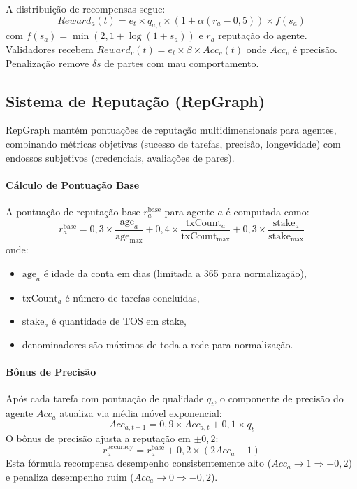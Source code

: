\documentclass[11pt]{article}
\begin{document}
A distribuição de recompensas segue:
\begin{equation}
Reward_a(t) = e_t \times q_{a,t} \times \left(1 + \alpha (r_a - 0,5)\right) \times f(s_a)
\end{equation}
com $f(s_a) = \min(2, 1 + \log(1+s_a))$ e $r_a$ reputação do agente. Validadores recebem $Reward_v(t) = e_t \times \beta \times Acc_v(t)$ onde $Acc_v$ é precisão. Penalização remove $\delta s$ de partes com mau comportamento.

\subsection{Sistema de Reputação (RepGraph)}
\label{sec:reputation}
RepGraph mantém pontuações de reputação multidimensionais para agentes, combinando métricas objetivas (sucesso de tarefas, precisão, longevidade) com endossos subjetivos (credenciais, avaliações de pares).

\paragraph{Cálculo de Pontuação Base} A pontuação de reputação base $r_a^{\text{base}}$ para agente $a$ é computada como:
\begin{equation}
r_a^{\text{base}} = 0,3 \times \frac{\text{age}_a}{\text{age}_{\max}} + 0,4 \times \frac{\text{txCount}_a}{\text{txCount}_{\max}} + 0,3 \times \frac{\text{stake}_a}{\text{stake}_{\max}}
\end{equation}
onde:
\begin{itemize}[noitemsep]
  \item $\text{age}_a$ é idade da conta em dias (limitada a 365 para normalização),
  \item $\text{txCount}_a$ é número de tarefas concluídas,
  \item $\text{stake}_a$ é quantidade de TOS em stake,
  \item denominadores são máximos de toda a rede para normalização.
\end{itemize}

\paragraph{Bônus de Precisão} Após cada tarefa com pontuação de qualidade $q_t$, o componente de precisão do agente $Acc_a$ atualiza via média móvel exponencial:
\begin{equation}
Acc_{a,t+1} = 0,9 \times Acc_{a,t} + 0,1 \times q_t
\end{equation}
O bônus de precisão ajusta a reputação em $\pm 0,2$:
\begin{equation}
r_a^{\text{accuracy}} = r_a^{\text{base}} + 0,2 \times (2 Acc_a - 1)
\end{equation}
Esta fórmula recompensa desempenho consistentemente alto ($Acc_a \to 1 \Rightarrow +0,2$) e penaliza desempenho ruim ($Acc_a \to 0 \Rightarrow -0,2$).
\end{document}
